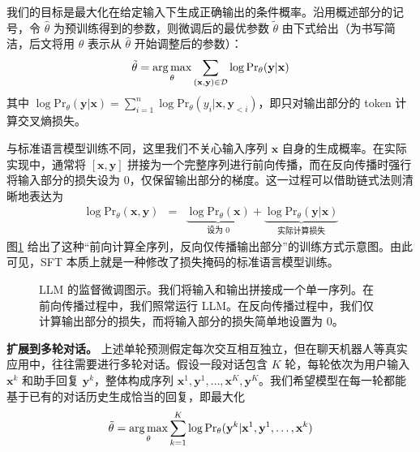 \noindent 我们的目标是最大化在给定输入下生成正确输出的条件概率。沿用概述部分的记号，令 $\hat{\theta}$ 为预训练得到的参数，则微调后的最优参数 $\tilde{\theta}$ 由下式给出（为书写简洁，后文将用 $\theta$ 表示从 $\hat{\theta}$ 开始调整后的参数）：
\begin{eqnarray}
\tilde{\theta} = \operatorname*{arg\,max}_{\theta} \sum_{(\mathbf{x},\mathbf{y}) \in \mathcal{D}} \log \mathrm{Pr}_{\theta}(\mathbf{y}|\mathbf{x})
\label{eq:sft-objective}
\end{eqnarray}
其中 $\log \mathrm{Pr}_{\theta}(\mathbf{y}|\mathbf{x}) = \sum_{i=1}^{n} \log \mathrm{Pr}_{\theta}(y_i|\mathbf{x},\mathbf{y}_{<i})$，即只对输出部分的 token 计算交叉熵损失。

与标准语言模型训练不同，这里我们不关心输入序列 $\mathbf{x}$ 自身的生成概率。在实际实现中，通常将 $[\mathbf{x}, \mathbf{y}]$ 拼接为一个完整序列进行前向传播，而在反向传播时强行将输入部分的损失设为 $0$，仅保留输出部分的梯度。这一过程可以借助链式法则清晰地表达为
\begin{eqnarray}
\log \mathrm{Pr}_{\theta}(\mathbf{x},\mathbf{y}) &=& \underbrace{\log \mathrm{Pr}_{\theta}(\mathbf{x})}_{\text{设为 } 0} + \underbrace{\log \mathrm{Pr}_{\theta}(\mathbf{y}|\mathbf{x})}_{\text{实际计算损失}}
\label{eq:sft-chain}
\end{eqnarray}
图\ref{fig:sft-forward-backward} 给出了这种“前向计算全序列，反向仅传播输出部分”的训练方式示意图。由此可见，SFT 本质上就是一种修改了损失掩码的标准语言模型训练。

\begin{figure}[!t]
\centering

\caption{LLM 的监督微调图示。我们将输入和输出拼接成一个单一序列。在前向传播过程中，我们照常运行 LLM。在反向传播过程中，我们仅计算输出部分的损失，而将输入部分的损失简单地设置为 0。}
\label{fig:sft-forward-backward}
\end{figure}

\vspace{0.5em}
\noindent\textbf{扩展到多轮对话。}
上述单轮预测假定每次交互相互独立，但在聊天机器人等真实应用中，往往需要进行多轮对话。假设一段对话包含 $K$ 轮，每轮依次为用户输入 $\mathbf{x}^k$ 和助手回复 $\mathbf{y}^k$，整体构成序列 $\mathbf{x}^1,\mathbf{y}^1,\dots,\mathbf{x}^K,\mathbf{y}^K$。我们希望模型在每一轮都能基于已有的对话历史生成恰当的回复，即最大化
\begin{eqnarray}
\tilde{\theta} = \operatorname*{arg\,max}_{\theta} \sum_{k=1}^{K} \log \mathrm{Pr}_{\theta}(\mathbf{y}^k|\mathbf{x}^1,\mathbf{y}^1,\dots,\mathbf{x}^k)
\label{eq:multi-turn-obj}
\end{eqnarray}

